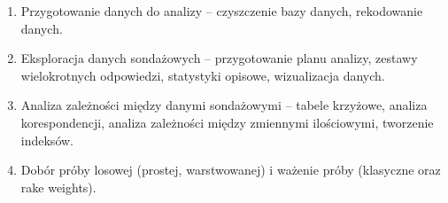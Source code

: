 \documentclass[\main/boa.tex]{subfiles}
\begin{document}
\planwarsztatu
\begin{enumerate}
\item Przygotowanie danych do analizy – czyszczenie bazy danych, rekodowanie danych.
\item Eksploracja danych sondażowych – przygotowanie planu analizy, zestawy wielokrotnych odpowiedzi, statystyki opisowe, wizualizacja danych.
\item Analiza zależności między danymi sondażowymi – tabele krzyżowe, analiza korespondencji, analiza zależności między zmiennymi ilościowymi, tworzenie indeksów.
\item Dobór próby losowej (prostej, warstwowanej) i ważenie próby (klasyczne oraz rake weights).
\end{enumerate}	 
\end{document}
